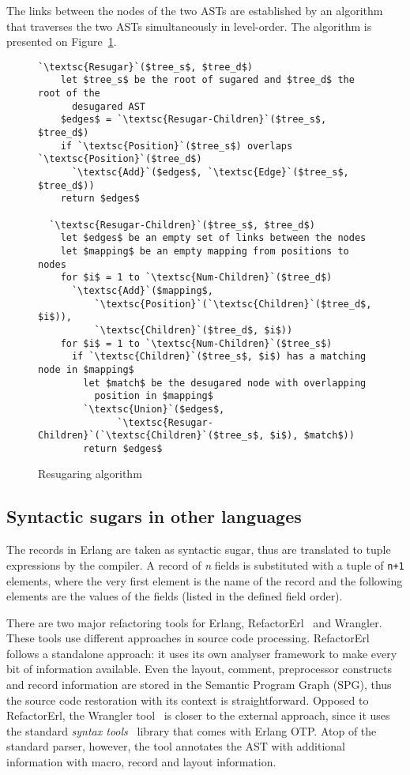 \documentclass[11pt]{amsart}
\begin{document}
The links between
the nodes of the two ASTs are established by an algorithm that
traverses the two ASTs simultaneously in level-order.
The algorithm is presented on Figure~\ref{fig:res}.

\begin{figure}[!htb]
\begin{lstlisting}[mathescape=true,escapechar=\`,deletekeywords={with}]
  `\textsc{Resugar}`($tree_s$, $tree_d$)
    let $tree_s$ be the root of sugared and $tree_d$ the root of the
      desugared AST
    $edges$ = `\textsc{Resugar-Children}`($tree_s$, $tree_d$)
    if `\textsc{Position}`($tree_s$) overlaps `\textsc{Position}`($tree_d$)
      `\textsc{Add}`($edges$, `\textsc{Edge}`($tree_s$, $tree_d$))
    return $edges$

  `\textsc{Resugar-Children}`($tree_s$, $tree_d$)
    let $edges$ be an empty set of links between the nodes
    let $mapping$ be an empty mapping from positions to nodes
    for $i$ = 1 to `\textsc{Num-Children}`($tree_d$)
      `\textsc{Add}`($mapping$,
          `\textsc{Position}`(`\textsc{Children}`($tree_d$, $i$)),
          `\textsc{Children}`($tree_d$, $i$))
    for $i$ = 1 to `\textsc{Num-Children}`($tree_s$)
      if `\textsc{Children}`($tree_s$, $i$) has a matching node in $mapping$
        let $match$ be the desugared node with overlapping
          position in $mapping$
        `\textsc{Union}`($edges$,
              `\textsc{Resugar-Children}`(`\textsc{Children}`($tree_s$, $i$), $match$))
        return $edges$
\end{lstlisting}
\caption{Resugaring algorithm}
\label{fig:res}
\end{figure}
\subsection{Syntactic sugars in other languages}

The records in Erlang are taken as syntactic sugar, thus are
translated to tuple expressions by the compiler. A record of
\textit{n} fields is substituted with a tuple of \texttt{n+1}
elements, where the very first element is the name of the record and
the following elements are the values of the fields (listed in the
defined field order).

There are two major refactoring tools for Erlang,
RefactorErl~\cite{kept09} and Wrangler. These tools use different
approaches in source code processing. RefactorErl follows a standalone approach: it uses its own
analyser framework to make every bit of information available. Even
the layout, comment, preprocessor constructs and record information are
stored in the Semantic Program Graph (SPG), thus the source code
restoration with its context is straightforward. Opposed to
RefactorErl, the Wrangler tool~\cite{wrangler} is closer to the external approach,
since it uses the standard \emph{syntax tools}~\cite{erlsyntax} library that
comes with Erlang OTP. Atop of the standard parser, however, the
tool annotates the AST with additional information with macro, record
and layout information.
\end{document}

